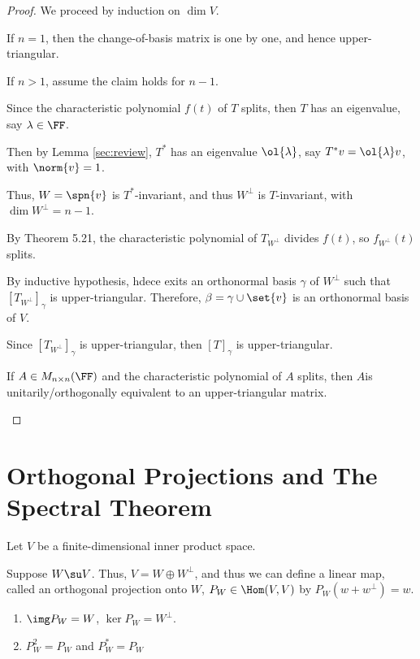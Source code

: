 \documentclass[11pt]{scrartcl}
\begin{document}
\begin{proof}
  \hfill

  We proceed by induction on $\dim V$.

  If $n=1$, then the change-of-basis matrix is one by one, and hence
  upper-triangular.

  If $n> 1$, assume the claim holds for $n-1$.

  Since the characteristic polynomial $f(t)$ of $T$ splits, then $T$
  has an eigenvalue, say $\lambda \in \FF$.

  Then by Lemma \ref{sec:review}, $T^{*}$ has an eigenvalue
  $\ol{\lambda}$, say $T^{*}v = \ol{\lambda}v$, with $\norm{v} = 1$.

  Thus, $W = \spn{v}$ is $T^{*}$-invariant, and thus $W^{\bot}$ is
  $T$-invariant, with $\dim W^{\bot} = n-1$.

  By Theorem 5.21, the characteristic polynomial of $T_{W^{\bot}}$
  divides $f(t)$, so $f_{W^{\bot}}(t)$ splits.

  By inductive hypothesis, hdece exits an orthonormal basis $\gamma$
  of $W^{\bot}$ such that $[T_{W^{\bot}}]_{\gamma}$ is
  upper-triangular. Therefore, $\beta = \gamma\cup\set{v}$ is an
  orthonormal basis of $V$.

  Since $[T_{W^{\bot}}]_{\gamma}$ is upper-triangular, then
  $[T]_{\gamma}$ is upper-triangular.

  \begin{corollary}
    If $A \in M_{n\times n}(\FF)$ and the characteristic polynomial of
    $A$ splits, then $A$is unitarily/orthogonally equivalent to an
    upper-triangular matrix.
  \end{corollary}
\end{proof}
\section{Orthogonal Projections and The Spectral Theorem}

Let $V$ be a finite-dimensional inner product space.

Suppose $W\su V$. Thus, $V = W\oplus W^{\bot}$, and thus we can define
a linear map, called an orthogonal projection onto $W$,
$P_W \in \Hom(V,V)$ by $P_W(w+w^{\bot}) = w$.

\begin{theorem}
  \label{sec:orth-proj-spectr}
  \begin{enumerate}[label=\alph*)]
  \item $\img P_W = W$, $\ker P_W = W^{\bot}$.
  \item $P_W^2 = P_{W}$ and $P_{W}^{*} = P_{W}$
  \end{enumerate}
\end{theorem}
\end{document}

